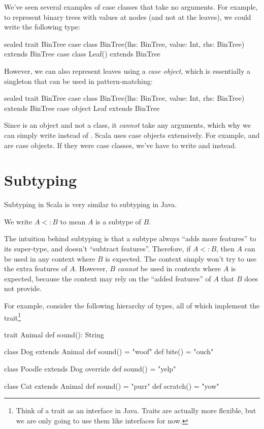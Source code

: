 \documentclass{book}
\begin{document}
We've seen several examples of case classes that take no arguments. For example,
to represent binary trees with values at nodes (and not at the leaves), we could
write the following type:
%
\begin{scalacode}
sealed trait BinTree
case class BinTree(lhs: BinTree, value: Int, rhs: BinTree) extends BinTree
case class Leaf() extends BinTree
\end{scalacode}

However, we can also represent leaves using a \emph{case object}, which is essentially
a singleton that can be used in pattern-matching:
%
\begin{scalacode}
sealed trait BinTree
case class BinTree(lhs: BinTree, value: Int, rhs: BinTree) extends BinTree
case object Leaf extends BinTree
\end{scalacode}

Since  is an object and not a class, it \emph{cannot}
take any arguments, which why we can simply write  instead
of . Scala uses case objects extensively. For example,
 and  are case objects. If they
were case classes, we've have to write  and
 instead.

\section{Subtyping}

Subtyping in Scala is very similar to subtyping in Java.

\begin{notation}
We write $A <: B$ to mean $A$ is a subtype of $B$.
\end{notation}

The intuition behind subtyping is that a subtype always ``adds more features''
to its super-type, and doesn't ``subtract features''. Therefore, if $A <: B$,
then $A$ can be used in any context where $B$ is expected. The context simply
won't try to use the extra features of $A$. However, $B$ \emph{cannot}
be used in contexts where $A$ is expected, because the context may rely on
the ``added features'' of $A$ that $B$ does not provide.

For example, consider the following hierarchy of types, all of which
implement the  trait\footnote{Think of a trait as an interface in Java. Traits
are actually more flexible, but we are only going to use them like interfaces for now.}
%
\begin{scalacode}
trait Animal {
  def sound(): String
}

class Dog extends Animal {
  def sound() = "woof"
  def bite() = "ouch"
}

class Poodle extends Dog {
  override def sound() = "yelp"
}

class Cat extends Animal {
  def sound() = "purr"
  def scratch() = "yow"
}
\end{scalacode}
\end{document}
